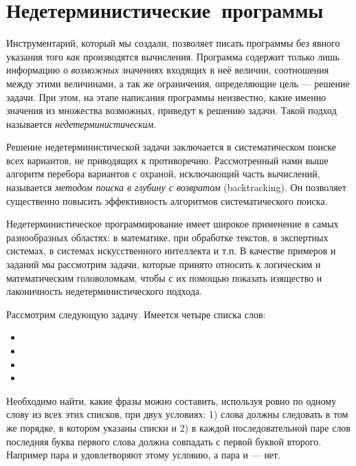 \section{Недетерминисти\-чес\-кие~программы}%
Инструментарий, который мы создали, позволяет писать программы без явного указания того \emph{как} производятся вычисления. Программа содержит только лишь информацию о \emph{возможных} значениях входящих в неё величин, соотношения между этими величинами, а так же ограничения, определяющие цель --- решение задачи. При этом, на этапе написания программы неизвестно, какие именно значения из множества возможных, приведут к решению задачи. Такой подход называется \emph{недетерминистическим}.

Решение недетерминистической задачи заключается в систематическом поиске всех вариантов, не приводящих к противоречию. Рассмотренный нами выше алгоритм перебора вариантов с охраной, исключающий часть вычислений, называется \emph{методом поиска в глубину с возвратом} (backtracking). Он позволяет существенно повысить эффективность алгоритмов систематического поиска.

Недетерминистическое программирование имеет широкое применение в самых разнообразных областях: в математике, при обработке текстов, в экспертных системах, в системах искусственного интеллекта и т.п. В качестве примеров и заданий мы рассмотрим задачи, которые принято относить к логическим и математическим головоломкам, чтобы с их помощью показать изящество и лаконичность недетерминистического подхода.

Рассмотрим следующую задачу. Имеется четыре списка слов:

\begin{itemize}
  \item {}
  \item {}
  \item {}
  \item {}
\end{itemize}

Необходимо найти, какие фразы можно составить, используя ровно по одному слову из всех этих списков, при двух условиях: 1) слова должны следовать в том же порядке, в котором указаны списки и 2) в каждой последовательной паре слов последняя буква первого слова должна совпадать с первой буквой второго. Например пара  и  удовлетворяют этому условию, а пара  и  --- нет. 

